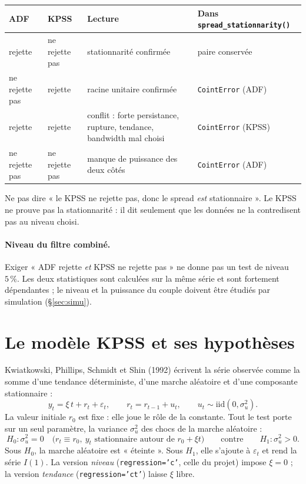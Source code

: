 \documentclass[11pt,a4paper]{article}
\newcommand{\code}[1]{\texttt{#1}}
\theoremstyle{definition}
\begin{document}
\begin{center}
\begin{tabularx}{\textwidth}{@{}llXX@{}}
\toprule
ADF & KPSS & Lecture & Dans \code{spread\_stationnarity()} \\
\midrule
rejette & ne rejette pas & stationnarité confirmée & paire conservée \\
ne rejette pas & rejette & racine unitaire confirmée & \code{CointError} (ADF) \\
rejette & rejette & conflit : forte persistance, rupture, tendance, bandwidth mal choisi & \code{CointError} (KPSS) \\
ne rejette pas & ne rejette pas & manque de puissance des deux côtés & \code{CointError} (ADF) \\
\bottomrule
\end{tabularx}
\end{center}

\begin{piege}
Ne pas dire « le KPSS ne rejette pas, donc le spread \emph{est} stationnaire ». Le KPSS ne prouve pas la stationnarité : il dit seulement que les données ne la contredisent pas au niveau choisi.
\end{piege}

\paragraph{Niveau du filtre combiné.} Exiger « ADF rejette \emph{et} KPSS ne rejette pas » ne donne pas un test de niveau $5\,\%$. Les deux statistiques sont calculées sur la même série et sont fortement dépendantes ; le niveau et la puissance du couple doivent être étudiés par simulation (\S\ref{sec:simu}).

\section{Le modèle KPSS et ses hypothèses}

Kwiatkowski, Phillips, Schmidt et Shin (1992) écrivent la série observée comme la somme d'une tendance déterministe, d'une marche aléatoire et d'une composante stationnaire :
\begin{equation}\label{eq:modele}
y_t = \xi\, t + r_t + \varepsilon_t, \qquad r_t = r_{t-1} + u_t, \qquad u_t \sim \text{iid}(0,\sigma_u^2).
\end{equation}
La valeur initiale $r_0$ est fixe : elle joue le rôle de la constante. Tout le test porte sur un seul paramètre, la variance $\sigma_u^2$ des chocs de la marche aléatoire :
\[
H_0 : \sigma_u^2 = 0 \quad \bigl(r_t \equiv r_0,\ y_t \text{ stationnaire autour de } r_0 + \xi t\bigr)
\qquad\text{contre}\qquad
H_1 : \sigma_u^2 > 0 .
\]
Sous $H_0$, la marche aléatoire est « éteinte ». Sous $H_1$, elle s'ajoute à $\varepsilon_t$ et rend la série $I(1)$. La version \emph{niveau} (\code{regression='c'}, celle du projet) impose $\xi = 0$ ; la version \emph{tendance} (\code{regression='ct'}) laisse $\xi$ libre.
\end{document}
